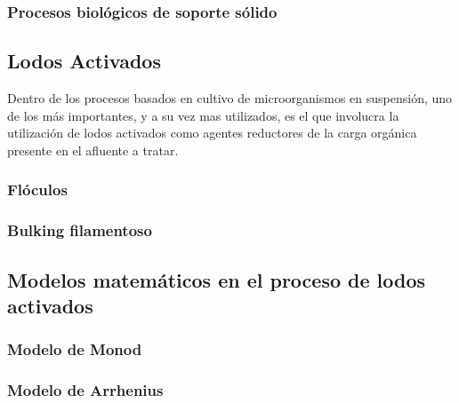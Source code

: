 \subsubsection{Procesos biológicos de soporte sólido}
\subsection{Lodos Activados}
Dentro de los procesos basados en cultivo de microorganismos en suspensión, uno de los más importantes, y a su vez mas utilizados, es el que involucra la utilización de lodos activados como agentes reductores de la carga orgánica presente en el afluente a tratar.
\subsubsection{Flóculos}
\subsubsection{Bulking filamentoso}
\subsection{Modelos matemáticos en el proceso de lodos activados}
\subsubsection{Modelo de Monod}
\subsubsection{Modelo de Arrhenius}
